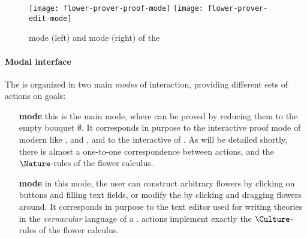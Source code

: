 \begin{figure*}
  \texttt{[image: flower-prover-proof-mode]}
  \hspace{1em}
  \texttt{[image: flower-prover-edit-mode]}
  \caption{\Proof mode (left) and \Edit mode (right) of the }
\end{figure*}

\paragraph{Modal interface}

The  is organized in two main \emph{modes} of interaction,
providing different sets of  actions on
goals:
\begin{itemize}
  \item[\textbf{\Proof mode}] this is the main mode, where  can be proved by
  reducing them to the empty bouquet $\emptyset$. It corresponds in purpose to
  the interactive proof mode of modern  like ,  and
  , and to the interactive  of .
  As will be detailed shortly, there is almost a one-to-one correspondence
  between \Proof actions, and the $\Nature$-rules of the flower calculus.
  
  \item[\textbf{\Edit mode}] in this mode, the user can construct arbitrary
  flowers by clicking on buttons and filling text fields, or modify the  by
  clicking and dragging flowers around. It corresponds in purpose to the text
  editor used for writing theories in the \emph{vernacular} language of a . \Edit actions implement exactly the
  $\Culture$-rules of the flower calculus.
\end{itemize}

